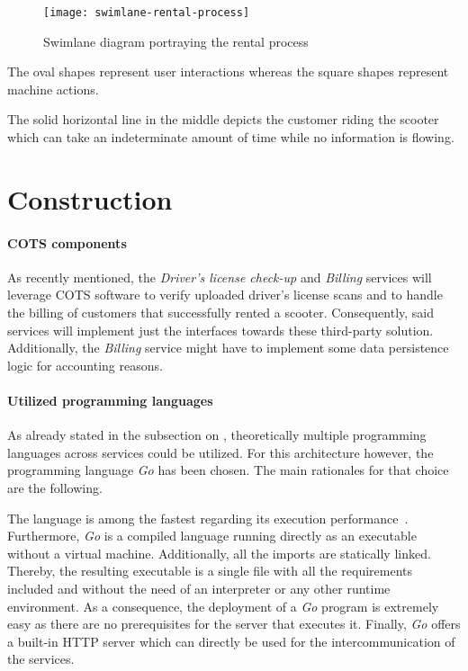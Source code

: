 \documentclass[12pt,a4paper,twoside]{report}
\begin{document}
\begin{figure}[htbp]
\centering
\texttt{[image: swimlane-rental-process]}
\caption{Swimlane diagram portraying the rental process}
\label{fig:swimlane-rental-process}
\end{figure}

The oval shapes represent user interactions whereas the square shapes represent
machine actions.

The solid horizontal line in the middle depicts the customer riding the scooter
which can take an indeterminate amount of time while no information is flowing.


\section{Construction} \label{subsect:analysis-construction}

\paragraph{COTS components}
As recently mentioned, the \textit{Driver's license check-up} and \textit{Billing}
services will leverage COTS software to verify uploaded driver's license scans
and to handle the billing of customers that successfully rented a scooter.
Consequently, said services will implement just the interfaces towards these
third-party solution. Additionally, the \textit{Billing} service might have
to implement some data persistence logic for accounting reasons.

\paragraph{Utilized programming languages}
As already stated in the subsection on \textit{},
theoretically multiple programming languages across services could be utilized.
For this architecture however, the programming language \textit{Go} has been chosen.
The main rationales for that choice are the following.

The language is among the fastest regarding its execution performance~\cn.
Furthermore, \textit{Go} is a compiled language running directly as an executable
without a virtual machine. Additionally, all the imports are statically linked.
Thereby, the resulting executable is a single file with all the requirements
included and without the need of an interpreter or any other runtime environment.
As a consequence, the deployment of a \textit{Go} program is extremely easy as
there are no prerequisites for the server that executes it.
Finally, \textit{Go} offers a built-in HTTP server which can directly be used
for the intercommunication of the services.
\end{document}
